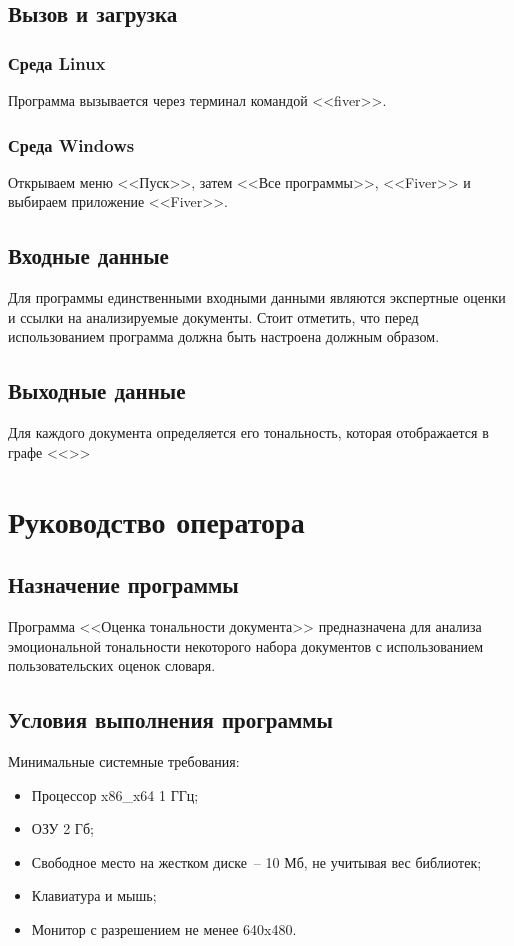 \documentclass[a4paper,14pt,russian]{extreport}
\begin{document}
\subsection{Вызов и загрузка}
\subsubsection{Среда Linux}
Программа вызывается через терминал командой <<fiver>>.
\subsubsection{Среда Windows}
Открываем меню <<Пуск>>, затем <<Все программы>>, <<Fiver>> и выбираем приложение <<Fiver>>.
\subsection{Входные данные}
Для программы единственными входными данными являются экспертные оценки и ссылки на анализируемые документы. Стоит отметить, что перед использованием программа должна быть настроена должным образом.
\subsection{Выходные данные}
Для каждого документа определяется его тональность, которая отображается в графе <<>>
\section{Руководство оператора}
\subsection{Назначение программы}

Программа <<Оценка тональности документа>> предназначена для анализа эмоциональной тональности некоторого набора документов с использованием пользовательских оценок словаря.
\subsection{Условия выполнения программы}

Минимальные системные требования:

\begin{itemize}
\item Процессор x86\_x64 1 ГГц;
\item ОЗУ 2 Гб;
\item Свободное место на жестком диске~-- 10 Мб, не учитывая вес библиотек;
\item Клавиатура и мышь;
\item Монитор с разрешением не менее 640x480.
\end{itemize}
\end{document}
